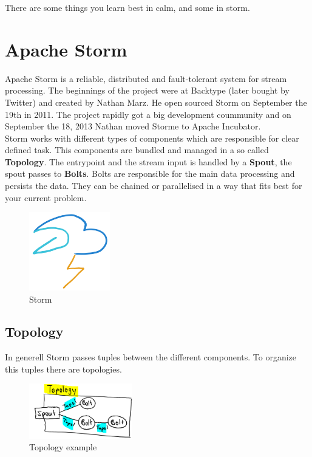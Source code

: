 \begin{savequote}[75mm]
There are some things you learn best in calm, and some in storm.
\end{savequote}

\chapter{Apache Storm}

Apache Storm is a reliable, distributed and fault-tolerant system for stream processing.
The beginnings of the project were at Backtype (later bought by Twitter) and created by Nathan Marz.
He open sourced Storm on September the 19th in 2011. The project rapidly got a big development coummunity and
on September the 18, 2013 Nathan moved Storme to Apache Incubator.\\

Storm works with different types of components which are responsible for clear defined task.
This components are bundled and managed in a so called \textbf{Topology}.
The entrypoint and the stream input is handled by a \textbf{Spout}, the spout passes to \textbf{Bolts}.
Bolts are responsible for the main data processing and persists the data.
They can be chained or parallelised in a way that fits best for your current problem.

\begin{figure}[hp]
\centering
\captionsetup{justification=centering}
\includegraphics[width=100pt]{images/storm.png}
\caption[Storm]{Storm}
\end{figure}

\newpage

\section{Topology}
In generell Storm passes tuples between the different components.
To organize this tuples there are topologies.


\begin{figure}[H]
\centering
\captionsetup{justification=centering}
\includegraphics[width=0.4\textwidth]{images/topology_example.png}
\caption[Topology example]{Topology example}
\end{figure}

